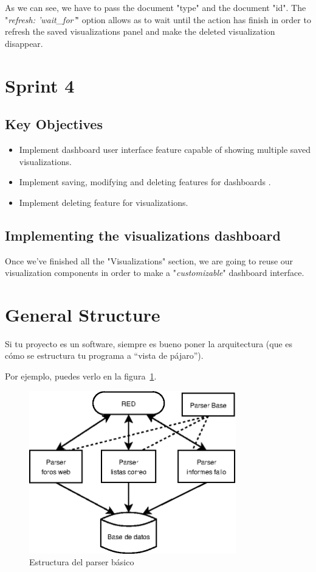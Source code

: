 \documentclass[a4paper, 12pt, english]{book}
\begin{document}
As we can see, we have to pass the document "type" and the document "id". The "\textit{refresh: 'wait\_for'}" option allows as to wait until the action has finish in order to refresh the saved visualizations panel and make the deleted visualization disappear.


\section{Sprint 4}
\label{sec:sprint-4}

\subsection{Key Objectives}
\label{sec:key-objectives}
\begin{itemize}
    \item Implement dashboard user interface feature capable of showing multiple saved visualizations.
    \item Implement saving, modifying and deleting features for dashboards .
    \item Implement deleting feature for visualizations.
\end{itemize}

\subsection{Implementing the visualizations dashboard}
\label{sec:visualizations-dashboard}
Once we've finished all the "Visualizations" section, we are going to reuse our visualization components in order to make a "\textit{customizable}" dashboard interface.



\section{General Structure}
\label{sec:general-structure}

Si tu proyecto es un software, siempre es bueno poner la arquitectura (que es cómo se estructura tu programa a ``vista de pájaro'').

Por ejemplo, puedes verlo en la figura~\ref{fig:arquitectura}.

\begin{figure}
  \centering
  \includegraphics[width=9cm, keepaspectratio]{img/arquitectura}
  \caption{Estructura del parser básico}
  \label{fig:arquitectura}
\end{figure}
\end{document}
